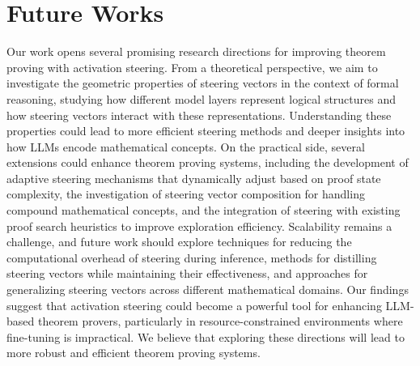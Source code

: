 \section{Future Works}
Our work opens several promising research directions for improving theorem proving with activation steering. From a theoretical perspective, we aim to investigate the geometric properties of steering vectors in the context of formal reasoning, studying how different model layers represent logical structures and how steering vectors interact with these representations. Understanding these properties could lead to more efficient steering methods and deeper insights into how LLMs encode mathematical concepts. On the practical side, several extensions could enhance theorem proving systems, including the development of adaptive steering mechanisms that dynamically adjust based on proof state complexity, the investigation of steering vector composition for handling compound mathematical concepts, and the integration of steering with existing proof search heuristics to improve exploration efficiency. Scalability remains a challenge, and future work should explore techniques for reducing the computational overhead of steering during inference, methods for distilling steering vectors while maintaining their effectiveness, and approaches for generalizing steering vectors across different mathematical domains. Our findings suggest that activation steering could become a powerful tool for enhancing LLM-based theorem provers, particularly in resource-constrained environments where fine-tuning is impractical. We believe that exploring these directions will lead to more robust and efficient theorem proving systems.
